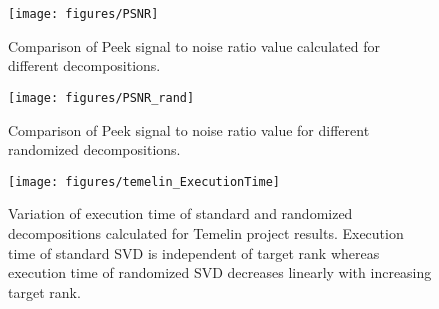 \begin{figure}[ht]
\centering\texttt{[image: figures/PSNR]}
\caption{Comparison of Peek signal to noise ratio value calculated for different decompositions.}
\label{fig:PSNR}
\end{figure}

\begin{figure}[ht]
\centering\texttt{[image: figures/PSNR\_rand]}
\caption{Comparison of Peek signal to noise ratio value for different randomized decompositions.}
\label{fig:PSNR_rand}
\end{figure}

\begin{figure}[ht]
\centering\texttt{[image: figures/temelin\_ExecutionTime]}
\caption{Variation of execution time of standard and randomized decompositions calculated for Temelin project results. Execution time of standard SVD is independent of target rank whereas execution time of randomized SVD decreases linearly with increasing target rank.}
\label{fig:temelin:ExeTime}
\end{figure}
